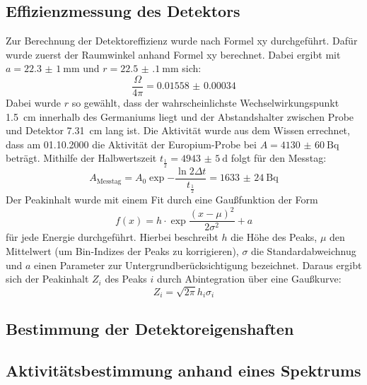 \subsection{Effizienzmessung des Detektors}
\label{sec:Effizienzmessung}
Zur Berechnung der Detektoreffizienz wurde nach Formel xy durchgeführt.  %
Dafür wurde zuerst der Raumwinkel anhand Formel xy berechnet. Dabei  %
ergibt mit $a = \SI{22.3(10)}{\milli\meter}$ und $r = \SI{22.5(1)}{\milli\meter}$
sich:
\begin{equation}
  \frac{\Omega}{4\pi} = \num{0.01558(34)}  %
\end{equation}
Dabei wurde $r$ so gewählt, dass der wahrscheinlichste Wechselwirkungspunkt
\SI{1.5}{\centi\meter} innerhalb des Germaniums liegt und der Abstandshalter
zwischen Probe und Detektor \SI{7.31}{\centi\meter} lang ist.
Die Aktivität wurde aus dem Wissen errechnet, dass am 01.10.2000 die Aktivität
der Europium-Probe bei $A = \SI{4130(60)}{\becquerel}$ beträgt. Mithilfe der
Halbwertszeit $t_\frac{1}{2} = \SI{4943(5)}{\day}$ folgt für den Messtag:
\begin{equation}
    A_\text{Messtag} = A_0 \exp{-\frac{\ln{2} \Delta t}{t_\frac{1}{2}}}=\SI{1633(24)}{\becquerel}
\end{equation}
Der Peakinhalt wurde mit einem Fit durch eine Gaußfunktion der Form
\begin{equation}
  f(x) = h\cdot \exp{\frac{(x-\mu)^2}{2\sigma^2}} + a
\end{equation}
für jede Energie durchgeführt. Hierbei beschreibt $h$ die Höhe des Peaks, $\mu$
den Mittelwert (um Bin-Indizes der Peaks zu korrigieren), $\sigma$ die
Standardabweichnug und $a$ einen Parameter zur Untergrundberücksichtigung
bezeichnet.
Daraus ergibt sich der Peakinhalt $Z_i$ des Peaks $i$ durch Abintegration über
eine Gaußkurve:
\begin{equation}
  Z_i = \sqrt{2\pi} h_i \sigma_i
\end{equation}


\subsection{Bestimmung der Detektoreigenshaften}
\label{sec:Detektoreigenschaften}

\subsection{Aktivitätsbestimmung anhand eines Spektrums}
\label{sec:Aktivitätsbestimmung}


